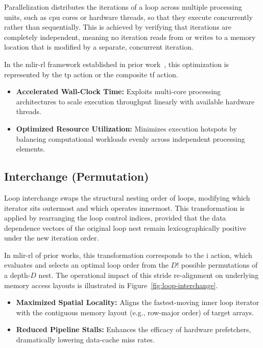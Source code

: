 Parallelization distributes the iterations of a loop across multiple processing units, such as \gls{cpu} cores or hardware threads, so that they execute concurrently rather than sequentially. This is achieved by verifying that iterations are completely independent, meaning no iteration reads from or writes to a memory location that is modified by a separate, concurrent iteration. 

In the \gls{mlir}-\gls{rl} framework established in prior work~\cite{bendib2024reinforcement}, this optimization is represented by the \gls{tp} action or the composite \gls{tf} action.

\begin{itemize}
    \item \textbf{Accelerated Wall-Clock Time:} Exploits multi-core processing architectures to scale execution throughput linearly with available hardware threads.
    \item \textbf{Optimized Resource Utilization:} Minimizes execution hotspots by balancing computational workloads evenly across independent processing elements.
\end{itemize}

\subsection{Interchange (Permutation)}

Loop interchange swaps the structural nesting order of loops, modifying which iterator sits outermost and which operates innermost. This transformation is applied by rearranging the loop control indices, provided that the data dependence vectors of the original loop nest remain lexicographically positive under the new iteration order.

In \gls{mlir}-\gls{rl} of prior works, this transformation corresponds to the \gls{i} action, which evaluates and selects an optimal loop order from the $D!$ possible permutations of a depth-$D$ nest. The operational impact of this stride re-alignment on underlying memory access layouts is illustrated in Figure~\ref{fig:loop-interchange}.

\begin{itemize}
    \item \textbf{Maximized Spatial Locality:} Aligns the fastest-moving inner loop iterator with the contiguous memory layout (e.g., row-major order) of target arrays.
    \item \textbf{Reduced Pipeline Stalls:} Enhances the efficacy of hardware prefetchers, dramatically lowering data-cache miss rates.
\end{itemize}

